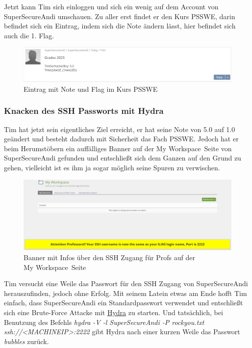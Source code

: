 \documentclass[10pt, a4paper,onecolumn ,titlepage]{article}
\begin{document}
    \noindent
    Jetzt kann Tim sich einloggen und sich ein wenig auf dem Account von SuperSecureAndi umschauen.
    Zu aller erst findet er den Kurs PSSWE, darin befindet sich ein Eintrag, indem sich die Note ändern lässt, hier befindet sich auch die 1. Flag.

    \begin{figure}[H]
        \centering
        \includegraphics[width=1\textwidth]{VM1_Bilder/ForumPost.PNG}
        \caption{Eintrag mit Note und Flag im Kurs PSSWE}
        \label{fig:ForumPost}
    \end{figure}

    \subsubsection{Knacken des SSH Passworts mit Hydra}
    Tim hat jetzt sein eigentliches Ziel erreicht, er hat seine Note von 5.0 auf 1.0 geändert und besteht dadurch mit Sicherheit das Fach PSSWE.
    Jedoch hat er beim Herumstöbern ein auffälliges Banner auf der \glqq My Workspace\grqq\ Seite von SuperSecureAndi gefunden und entschließt sich dem Ganzen auf den Grund zu gehen,
    vielleicht ist es ihm ja sogar möglich seine Spuren zu verwischen.

    \begin{figure}[H]
        \centering
        \includegraphics[width=1\textwidth]{VM1_Bilder/YellowBanner.PNG}
        \caption{Banner mit Infos über den SSH Zugang für Profs auf der \\ \glqq My Workspace\grqq\ Seite}
        \label{fig:YellowBanner}
    \end{figure}

    \noindent
    Tim versucht eine Weile das Passwort für den SSH Zugang von SuperSecureAndi herauszufinden, jedoch ohne Erfolg. Mit seinem Latein etwas am Ende hofft Tim einfach,
    dass SuperSecureAndi ein Standardpasswort verwendet und entschließt sich eine Brute-Force Attacke mit \href{https://github.com/vanhauser-thc/thc-hydra}{Hydra}
    zu starten. Und tatsächlich, bei Benutzung des Befehls \textit{hydra -V -l SuperSecureAndi -P rockyou.txt ssh://<MACHINEIP>:2222} gibt Hydra nach einer kurzen Weile das Passwort \textit{bubbles} zurück.
\end{document}
